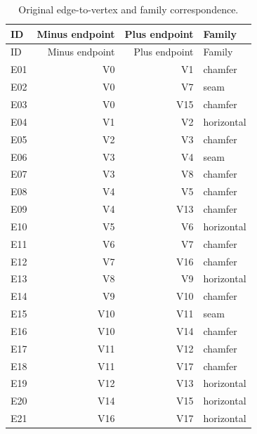 \begin{longtable}{@{}lrrl@{}}\caption{Original edge-to-vertex and family correspondence.}\label{tab:edges}\\\toprule ID & Minus endpoint & Plus endpoint & Family\\\midrule\endfirsthead\toprule ID & Minus endpoint & Plus endpoint & Family\\\midrule\endhead
E01 & V0 & V1 & chamfer \\
E02 & V0 & V7 & seam \\
E03 & V0 & V15 & chamfer \\
E04 & V1 & V2 & horizontal \\
E05 & V2 & V3 & chamfer \\
E06 & V3 & V4 & seam \\
E07 & V3 & V8 & chamfer \\
E08 & V4 & V5 & chamfer \\
E09 & V4 & V13 & chamfer \\
E10 & V5 & V6 & horizontal \\
E11 & V6 & V7 & chamfer \\
E12 & V7 & V16 & chamfer \\
E13 & V8 & V9 & horizontal \\
E14 & V9 & V10 & chamfer \\
E15 & V10 & V11 & seam \\
E16 & V10 & V14 & chamfer \\
E17 & V11 & V12 & chamfer \\
E18 & V11 & V17 & chamfer \\
E19 & V12 & V13 & horizontal \\
E20 & V14 & V15 & horizontal \\
E21 & V16 & V17 & horizontal \\
\bottomrule\end{longtable}